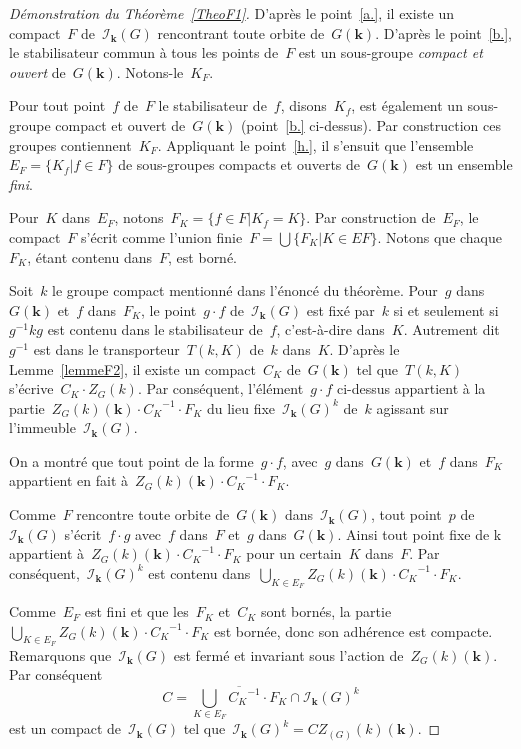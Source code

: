 \documentclass[french]{amsart}
\newcommand{\kk}{\mathbf{k}}
\newcommand{\Ik}{\mathscr{I}_\kk}
\begin{document}
\begin{proof}[Démonstration du Théorème~\ref{TheoF1}]
D'après le point~\ref{a.}, il existe un compact~$F$ de~$\Ik (G)$ rencontrant toute orbite de~$G(\kk)$. D'après le point~\ref{b.}, le stabilisateur commun à tous les points de~$F$ est un sous-groupe \emph{compact et ouvert} de~$G(\kk)$. Notons-le~$K_F$.

Pour tout point~$f$ de~$F$ le stabilisateur de~$f$, disons~$K_f$, est également un sous-groupe compact et ouvert de~$G(\kk)$ (point~\ref{b.} ci-dessus). Par construction ces groupes contiennent~$K_F$. Appliquant le point~\ref{h.}, il s'ensuit que l'ensemble~$E_F=\{K_f|f\in F\}$ de sous-groupes compacts et ouverts de~$G(\kk)$ est un ensemble \emph{fini}.

Pour~$K$ dans~$E_F$, notons~$F_K = \{ f \in F |K_f = K \}$. Par construction de~$E_F$, le compact~$F$ s'écrit comme l'union finie~$F = \bigcup\{F_K |K \in EF \}$. Notons que chaque~$F_K$, étant
contenu dans~$F$, est borné.

Soit~$k$ le groupe compact mentionné dans l'énoncé du théorème. Pour~$g$
dans~$G(\kk)$ et~$f$ dans~$F_K$, le point~$g\cdot f$ de~$\Ik (G)$ est fixé par~$k$ si et seulement si~$g^{-1}kg$ est contenu dans le stabilisateur de~$f$, c'est-à-dire dans~$K$.  Autrement dit~$g^{-1}$ est
dans le transporteur~$T (k, K )$ de~$k$ dans~$K$. D'après le Lemme~\ref{lemmeF2}, il existe un compact~$C_K$ de~$G(\kk)$ tel que~$T(k,K)$ s'écrive~$C_K\cdot Z_G(k)$. Par conséquent, l'élément~$g\cdot f$ ci-dessus appartient à la partie~$Z_G(k)(\kk)\cdot {C_K}^{-1}\cdot F_K$ du lieu fixe~$\Ik(G)^k$ de~$k$ agissant sur l'immeuble~$\Ik(G)$.

On a montré que tout point de la forme~$g\cdot f$, avec~$g$ dans~$G(\kk)$ et~$f$ dans~$F_K$ appartient en fait à~$Z_G(k)(\kk)\cdot {C_K}^{-1}\cdot F_K$.

Comme~$F$ rencontre toute orbite de~$G(\kk)$ dans~$\Ik (G)$, tout point~$p$ de~$\Ik (G)$ s'écrit~$f\cdot g$ avec~$f$ dans~$F$ et~$g$ dans~$G(\kk)$.  Ainsi tout point fixe de k appartient
à~$Z_G(k)(\kk)\cdot {C_K}^{-1}\cdot F_K$ pour un certain~$K$ dans~$F$.  Par conséquent,~$\Ik (G)^k$ est contenu dans~$\bigcup_{K\in E_F}Z_G(k)(\kk)\cdot {C_K}^{-1}\cdot F_K$.

Comme~$E_F$ est fini et que les~$F_K$ et~$C_K$ sont bornés, la partie~$\bigcup_{K\in E_F}Z_G(k)(\kk)\cdot {C_K}^{-1}\cdot F_K$ est bornée, donc son adhérence est compacte. Remarquons que~$\Ik(G)$ est fermé et invariant sous l'action de~$Z_G(k)(\kk)$. Par conséquent
\[
C=\overline{\bigcup_{K\in E_F}{C_K}^{-1}\cdot F_K}\cap \Ik(G)^k
\]
est un compact de~$\Ik(G)$ tel que~$\Ik(G)^k=CZ_(G)(k)(\kk)$.




\end{proof}
\end{document}
